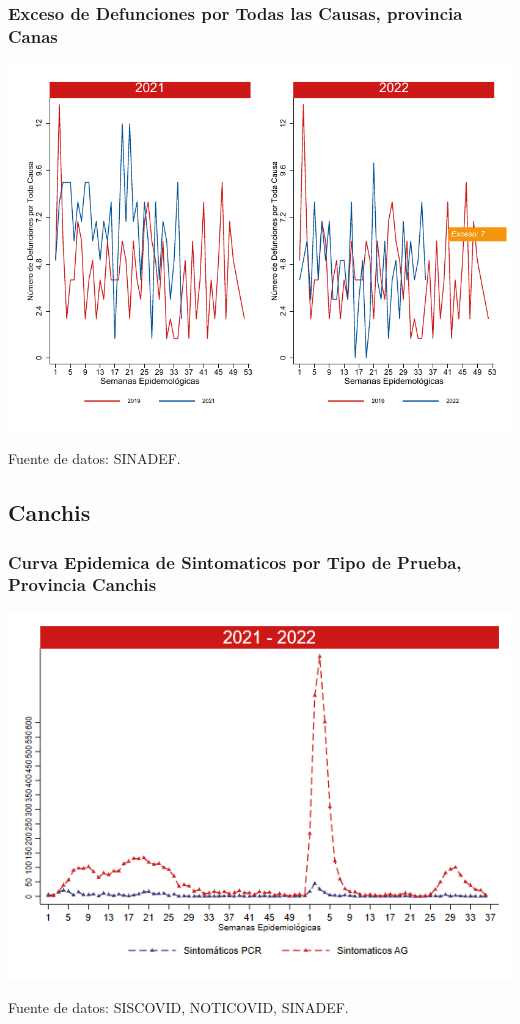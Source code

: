 \documentclass[xcolor=table]{beamer}
\begin{document}
\begin{frame}
	\frametitle{Exceso de Defunciones por Todas las Causas, provincia Canas}
	\vspace{-.5cm}
	\begin{center}
		\includegraphics[width=0.8\linewidth, trim={0cm .5cm 0cm 0.2cm},clip]{../figuras/exceso_4.pdf}
	\end{center}
	{\tiny Fuente de datos: SINADEF.}
	
	\hyperlink{indicadores_provinciales}{}
\end{frame}

\subsection{Canchis}
\begin{frame}[label=Canchis]
	\frametitle{Curva Epidemica de Sintomaticos por Tipo de Prueba, Provincia Canchis}
	\vspace{-.5cm}
	\begin{center}
		\includegraphics[width=0.8\linewidth, trim={0cm .5cm 0cm 0.2cm},clip]{../figuras/sinto_prueba20_21_5.png}
	\end{center}
	{\tiny Fuente de datos: SISCOVID, NOTICOVID, SINADEF.}
	\hyperlink{TipoPrueba}{}
\end{frame}
\end{document}
